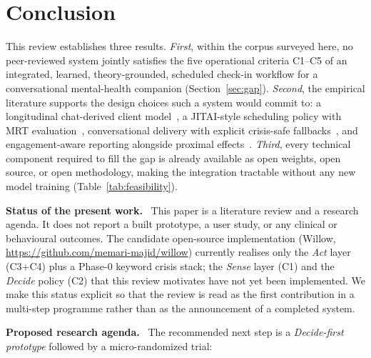 \documentclass[10pt,conference]{article}
\newcommand{\secref}[1]{Section~\ref{#1}}
\newcommand{\tabref}[1]{Table~\ref{#1}}
\renewcommand{\paragraph}[1]{\smallskip\par\noindent\textbf{#1}~\ignorespaces}
\begin{document}
\section{Conclusion}\label{sec:conclusion}

This review establishes three results. \emph{First}, within the
corpus surveyed here, no peer-reviewed system jointly satisfies the
five operational criteria \mbox{C1--C5} of an integrated, learned,
theory-grounded, scheduled check-in workflow for a conversational
mental-health companion (\secref{sec:gap}). \emph{Second}, the
empirical literature supports the design choices such a system would
commit to: a longitudinal chat-derived client
model~\cite{Xu2024MentalLLM,Wang2020COVIDStudentLife}, a
JITAI-style scheduling policy with MRT
evaluation~\cite{NahumShani2018JITAI,Klasnja2015MRT}, conversational
delivery with explicit crisis-safe
fallbacks~\cite{Heinz2025TherabotRCT,DeFreitas2024ChatbotSafety}, and
engagement-aware reporting alongside proximal
effects~\cite{Linardon2020Attrition}. \emph{Third}, every technical
component required to fill the gap is already available as open
weights, open source, or open methodology, making the integration
tractable without any new model training (\tabref{tab:feasibility}).

\paragraph{Status of the present work.}
This paper is a literature review and a research agenda. It does not
report a built prototype, a user study, or any clinical or behavioural
outcomes. The candidate open-source implementation (Willow,
\url{https://github.com/memari-majid/willow}) currently realises only
the \emph{Act} layer (C3+C4) plus a Phase-0 keyword crisis stack; the
\emph{Sense} layer (C1) and the \emph{Decide} policy (C2) that this
review motivates have not yet been implemented. We make this status
explicit so that the review is read as the first contribution in a
multi-step programme rather than as the announcement of a completed
system.

\paragraph{Proposed research agenda.}
The recommended next step is a \emph{Decide-first prototype} followed
by a micro-randomized trial:
\end{document}
